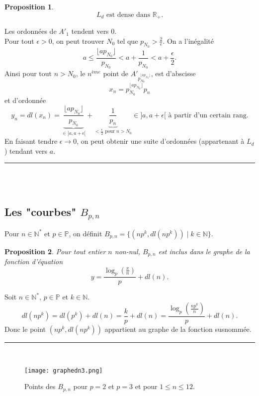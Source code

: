 \documentclass[a4paper, 12pt]{article}
\newcommand{\N}{\mathbb{N}}
\newcommand{\R}{\mathbb{R}}
\newcommand{\Pm}{\mathbb{P}}
\newcommand{\Prv}{\noindent{\it Preuve. }}
\newcommand{\cqfd}{\rule{0.2cm}{0.2cm}}
\newtheorem{prop}{Proposition}
\begin{document}
\begin{prop} \label{prop8} \begin{equation}\label{eq8} \text{$L_d$ est dense dans $\R_{+}$.} \end{equation} \end{prop}

\Prv
{} Les ordonnées de $A'_1$ tendent vers 0. \\

 Pour tout $\epsilon >0$, on peut trouver $N_0$ tel que $p_{N_0}>\frac{2}{\epsilon}$. On a l'inégalité
\[a \le \frac{\lfloor ap_{N_0} \rfloor}{p_{N_0}} < a+\frac{1}{p_{N_0}} < a + \frac{\epsilon}{2}. \]
Ainsi pour tout $n>N_0$, le $n^{ème}$ point de $A'_{p_{N_0}^{ \lfloor ap_{N_0} \rfloor}}$, est d'abscisse
\[x_n={p_{N_0}^{\lfloor ap_{N_0} \rfloor}} p_n \]
et d'ordonnée
\[y_n=dl(x_n)= \underbrace{\frac{\lfloor ap_{N_0} \rfloor}{p_{N_0}}}_{\in ]a, a+\epsilon[} + \underbrace{\frac{1}{p_n}}_{<\frac{\epsilon}{2} \text{ pour $n>N_0$}} \in ]a, a+\epsilon[ \text{ à partir d'un certain rang.}\]
En faisant tendre $\epsilon \rightarrow 0$, on peut obtenir une suite d'ordonnées (appartenant à $L_d$) tendant vers $a$. \cqfd \\ \\


\subsection {Les "courbes" $B_{p,n}$}

Pour $n \in \N^{*}$ et $p \in \Pm$, on définit $B_{p,n}= \{(np^{k}, dl(np^{k})) \mid k \in \N \}.$

\begin{prop} \label{prop9}
Pour tout entier $n$ non-nul, $B_{p,n}$ est inclus dans le graphe de la fonction d'équation \begin{equation} \label{eq9} y=\frac{\log_p(\frac{x}{n})}{p} + dl(n). \end{equation}
\end{prop}

\Prv Soit  $n \in \N^{*}$, $p \in \Pm$ et $k \in \N$.
\[dl(np^{k}) = dl(p^k) + dl(n) = \frac{k}{p} + dl(n) = \frac{\log_p(\frac{np^{k}}{n})}{p} + dl(n).\]
Donc le point $(np^{k}, dl(np^{k}))$ appartient au graphe de la fonction susnommée. \cqfd \\

\begin{figure}[ht]
\begin{center}
\texttt{[image: graphedn3.png]}
\end{center}
\caption{\footnotesize{ Points des $B_{p,n}$ pour $p=2$ et $p=3$ et pour $1 \le n \le 12$.}}
\label{nuagen 3}
\end{figure}
\end{document}
